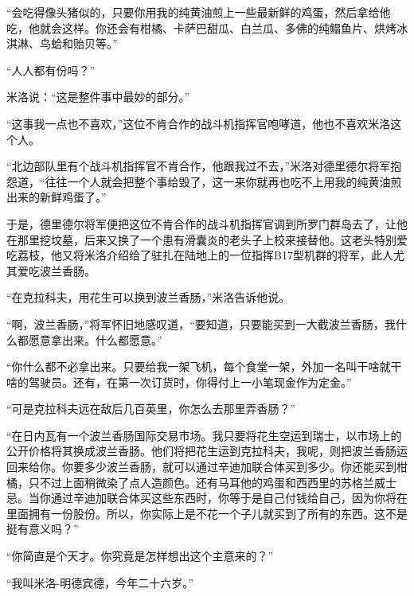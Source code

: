     “会吃得像头猪似的，只要你用我的纯黄油煎上一些最新鲜的鸡蛋，然后拿给他吃，他就会这样。你还会有柑橘、卡萨巴甜瓜、白兰瓜、多佛的纯鳎鱼片、烘烤冰淇淋、鸟蛤和贻贝等。”

    “人人都有份吗？”

    米洛说：“这是整件事中最妙的部分。”

    “这事我一点也不喜欢，”这位不肯合作的战斗机指挥官咆哮道，他也不喜欢米洛这个人。

    “北边部队里有个战斗机指挥官不肯合作，他跟我过不去，”米洛对德里德尔将军抱怨道，“往往一个人就会把整个事给毁了，这一来你就再也吃不上用我的纯黄油煎出来的新鲜鸡蛋了。”

    于是，德里德尔将军便把这位不肯合作的战斗机指挥官调到所罗门群岛去了，让他在那里挖坟墓，后来又换了一个患有滑囊炎的老头子上校来接替他。这老头特别爱吃荔枝，他又将米洛介绍给了驻扎在陆地上的一位指挥B17型机群的将军，此人尤其爱吃波兰香肠。

    “在克拉科夫，用花生可以换到波兰香肠，”米洛告诉他说。

    “啊，波兰香肠，”将军怀旧地感叹道，“要知道，只要能买到一大截波兰香肠，我什么都愿意拿出来。什么都愿意。”

    “你什么都不必拿出来。只要给我一架飞机，每个食堂一架，外加一名叫干啥就干啥的驾驶员。还有，在第一次订货时，你得付上一小笔现金作为定金。”

    “可是克拉科夫远在敌后几百英里，你怎么去那里弄香肠？”

    “在日内瓦有一个波兰香肠国际交易市场。我只要将花生空运到瑞士，以市场上的公开价格将其换成波兰香肠。他们将把花生运到克拉科夫，我呢，则把波兰香肠运回来给你。你要多少波兰香肠，就可以通过辛迪加联合体买到多少。你还能买到柑橘，只不过上面稍微染了点人造颜色。还有马耳他的鸡蛋和西西里的苏格兰威士忌。当你通过辛迪加联合体买这些东西时，你等于是自己付钱给自己，因为你将在里面拥有一份股份。所以，你实际上是不花一个子儿就买到了所有的东西。这不是挺有意义吗？”

    “你简直是个天才。你究竟是怎样想出这个主意来的？”

    “我叫米洛-明德宾德，今年二十六岁。”

